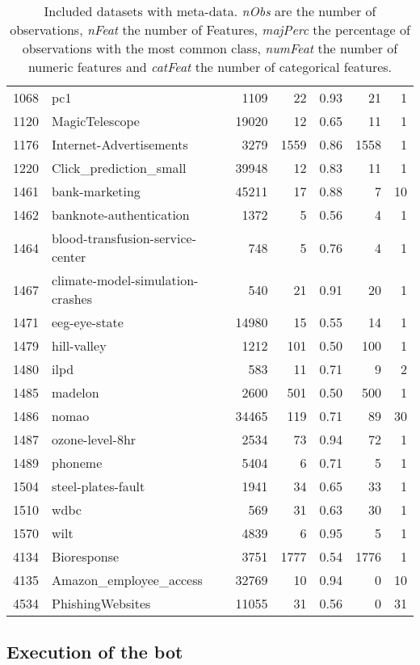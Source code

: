 \documentclass{article}
\begin{document}
\begin{table}[ht]
\begin{tabular}{rlrrrrr}
  1068 & pc1 & 1109 &  22 & 0.93 &  21 &   1 \\ 
  1120 & MagicTelescope & 19020 &  12 & 0.65 &  11 &   1 \\ 
  1176 & Internet-Advertisements & 3279 & 1559 & 0.86 & 1558 &   1 \\ 
  1220 & Click\_prediction\_small & 39948 &  12 & 0.83 &  11 &   1 \\ 
  1461 & bank-marketing & 45211 &  17 & 0.88 &   7 &  10 \\ 
  1462 & banknote-authentication & 1372 &   5 & 0.56 &   4 &   1 \\ 
  1464 & blood-transfusion-service-center & 748 &   5 & 0.76 &   4 &   1 \\ 
  1467 & climate-model-simulation-crashes & 540 &  21 & 0.91 &  20 &   1 \\ 
  1471 & eeg-eye-state & 14980 &  15 & 0.55 &  14 &   1 \\ 
  1479 & hill-valley & 1212 & 101 & 0.50 & 100 &   1 \\ 
  1480 & ilpd & 583 &  11 & 0.71 &   9 &   2 \\ 
  1485 & madelon & 2600 & 501 & 0.50 & 500 &   1 \\ 
  1486 & nomao & 34465 & 119 & 0.71 &  89 &  30 \\ 
  1487 & ozone-level-8hr & 2534 &  73 & 0.94 &  72 &   1 \\ 
  1489 & phoneme & 5404 &   6 & 0.71 &   5 &   1 \\ 
  1504 & steel-plates-fault & 1941 &  34 & 0.65 &  33 &   1 \\ 
  1510 & wdbc & 569 &  31 & 0.63 &  30 &   1 \\ 
  1570 & wilt & 4839 &   6 & 0.95 &   5 &   1 \\ 
  4134 & Bioresponse & 3751 & 1777 & 0.54 & 1776 &   1 \\ 
  4135 & Amazon\_employee\_access & 32769 &  10 & 0.94 &   0 &  10 \\ 
  4534 & PhishingWebsites & 11055 &  31 & 0.56 &   0 &  31 \\ 
   \hline
\end{tabular}
\endgroup
\caption{Included datasets with meta-data. \textit{nObs} are the number of observations, \textit{nFeat} the number of Features, \textit{majPerc} the percentage of observations with the most common class, \textit{numFeat} the number of numeric features and \textit{catFeat} the number of categorical features.} 
\label{tab:datasets}
\end{table}
\subsection{Execution of the bot}
\end{document}
